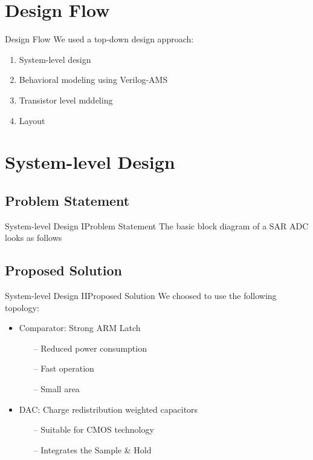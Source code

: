 \documentclass{beamer}
\begin{document}
 \section{Design Flow}
 \begin{frame}{Design Flow}
  We used a top-down design approach:
  \vspace{2em}
  \begin{enumerate}
   \item System-level design
   \item Behavioral modeling using Verilog-AMS
   \item Transistor level mddeling
   \item Layout
  \end{enumerate}
  \vspace{2em}
 \end{frame}

 \section{System-level Design}
 \subsection{Problem Statement}
 \begin{frame}
  {System-level Design I}{Problem Statement}
  The basic block diagram of a SAR ADC looks as follows

  \vspace*{2em}
  \resizebox{\textwidth}{!}{}
 \end{frame}
 \subsection{Proposed Solution}
 \begin{frame}
  {System-level Design II}{Proposed Solution}
  We choosed to use the following topology:
  \vspace{1em}
  \begin{itemize}
   \item Comparator: \alert{Strong ARM Latch}
    \begin{itemize}
     \item[--] Reduced power consumption 
     \item[--] Fast operation
     \item[--] Small area
    \end{itemize}
   \item<2-> DAC: \alert{Charge redistribution weighted capacitors}
    \begin{itemize}
     \item[--] Suitable for CMOS technology
     \item[--] Integrates the Sample \& Hold
    \end{itemize}
  \end{itemize}
 \end{frame}
\end{document}
